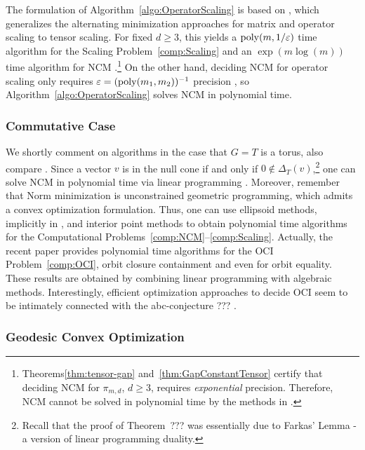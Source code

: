 The formulation of Algorithm~\ref{algo:OperatorScaling} is based on \cite{burgisser2017alternating}, which generalizes the alternating minimization approaches for matrix and operator scaling to tensor scaling. For fixed $d \geq 3$, this yields a $\operatorname{poly}(m, 1/\varepsilon)$ time algorithm for the Scaling Problem~\ref{comp:Scaling} \cite[Theorem~1]{burgisser2017alternating} and an $\exp(m\log(m))$ time algorithm for NCM \cite[Theorem~3.8]{burgisser2017alternating}.\footnote{Theorems\ref{thm:tensor-gap} and~\ref{thm:GapConstantTensor} certify that deciding NCM for $\pi_{m,d}$, $d \geq 3$, requires \emph{exponential} precision. Therefore, NCM cannot be solved in polynomial time by the methods in \cite{burgisser2017alternating}.}
On the other hand, deciding NCM for operator scaling only requires $\varepsilon = (\operatorname{poly}(m_1,m_2))^{-1}$ precision \cite{gurvits2004classical}, so Algorithm~\ref{algo:OperatorScaling} solves NCM in polynomial time.


\subsubsection*{Commutative Case}
We shortly comment on algorithms in the case that $G = T$ is a torus, also compare \cite[Subsection~1.4.1]{GradflowArXiv}. Since a vector $v$ is in the null cone if and only if $0 \notin \Delta_T(v)$,\footnote{Recall that the proof of Theorem~??? %
was essentially due to Farkas' Lemma - a version of linear programming duality.}
one can solve NCM in polynomial time via linear programming \cite{karmarkar1984new}. Moreover, remember that Norm minimization is unconstrained geometric programming, which admits a convex optimization formulation. Thus, one can use ellipsoid methods, implicitly in \cite{gurvits2004combinatorial, singh2014entropy, straszak2019computing}, and interior point methods \cite{burgisser2020interior} to obtain polynomial time algorithms for the Computational Problems~\ref{comp:NCM}--\ref{comp:Scaling}.
Actually, the recent paper \cite{dogan2021torus} provides polynomial time algorithms for the OCI Problem~\ref{comp:OCI}, orbit closure containment and even for orbit equality. These results are obtained by combining linear programming with algebraic methods. Interestingly, efficient optimization approaches to decide OCI seem to be intimately connected with the abc-conjecture ??? . %



\subsubsection*{Geodesic Convex Optimization}

